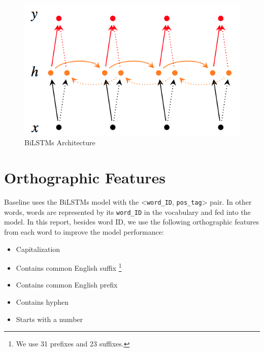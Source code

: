 \documentclass[11pt,letterpaper]{article}
\begin{document}
\begin{figure}
\includegraphics[scale=0.35]{bilstm-architecture.png}
\caption{BiLSTMs Architecture}
\label{fig:1}
\end{figure}

\section{Orthographic Features}

Baseline uses the BiLSTMs model with the {\selectfont <\texttt{word\_ID}, \texttt{pos\_tag}>}
pair. In other words, words are represented by its \texttt{word\_ID} in the vocabulary and fed into the
model. In this report, besides word ID, we use the following orthographic features from each word to improve the model 
performance:

\begin{itemize}
\item Capitalization
\item Contains common English suffix \cite{suffix} \footnote{We use 31 prefixes and 23 suffixes.}
\item Contains common English prefix \cite{suffix}
\item Contains hyphen
\item Starts with a number
\end{itemize}

\end{document}
